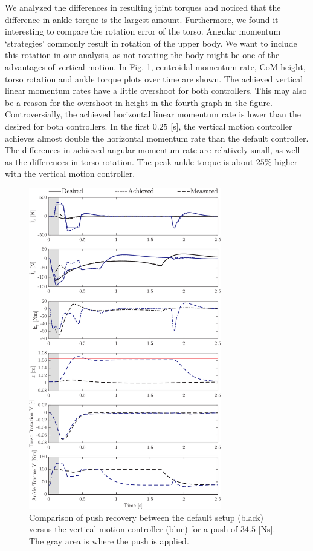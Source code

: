 \documentclass[letterpaper, 10 pt, conference]{ieeeconf}  %
\begin{document}
We analyzed the differences in resulting joint torques and noticed that the difference in ankle torque is the largest amount. Furthermore, we found it interesting to compare the rotation error of the torso. Angular momentum `strategies' commonly result in rotation of the upper body. We want to include this rotation in our analysis, as not rotating the body might be one of the advantages of vertical motion.  In Fig. \ref{fig:valcompare}, centroidal momentum rate, CoM height, torso rotation and ankle torque plots over time are shown. The achieved vertical linear momentum rates have a little overshoot for both controllers. This may also be a reason for the overshoot in height in the fourth graph in the figure. Controversially, the achieved horizontal linear momentum rate is lower than the desired for both controllers. In the first $0.25$ [s], the vertical motion controller achieves almost double the horizontal momentum rate than the default controller. The differences in achieved angular momentum rate are relatively small, as well as the differences in torso rotation. The peak ankle torque is about $25\%$ higher with the vertical motion controller.
\begin{figure}[h]
      \centering
      \includegraphics[width=3.3in]{valcomparetime.png}
      \caption{Comparison of push recovery between the default setup (black) versus the vertical motion controller (blue) for a push of $34.5$ [Ns]. The gray area is where the push is applied. }
      \label{fig:valcompare}
\end{figure}
\end{document}
